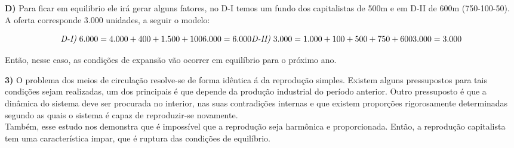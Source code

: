 \documentclass[a4paper, 12pt]{article} %
\begin{document}
\subparagraph{} \textbf{D)} Para ficar em equilibrio ele irá gerar alguns fatores, no D-I temos um fundo dos capitalistas de 500m e em D-II de 600m (750-100-50). A oferta corresponde 3.000 unidades, a seguir o modelo:

\begin{equation}
\textit{D-I)} \ 6.000 = 4.000 + 400 + 1.500 + 100
$$\\$$
6.000 = 6.000
$$\\$$
\textit{D-II)} \ 3.000 = 1.000 + 100 + 500 + 750 + 600
$$\\$$
3.000 = 3.000 
\end{equation}

Então, nesse caso, as condições de expansão vão ocorrer em equilíbrio para o próximo ano.


\vspace{0.5cm}

\par \textbf{3)} O problema dos meios de circulação resolve-se de forma idêntica á da reprodução simples. Existem alguns pressupostos para tais condições sejam realizadas, um dos principais é que depende da produção industrial do período anterior. Outro pressuposto é que a dinâmica do sistema deve ser procurada no interior, nas suas contradições internas e que existem proporções rigorosamente determinadas segundo as quais o sistema é capaz de reproduzir-se novamente.
\\
Também, esse estudo nos demonstra que é impossível que a reprodução seja harmônica e proporcionada. Então, a reprodução capitalista tem uma característica impar, que é ruptura das condições de equilíbrio. 
\end{document}
